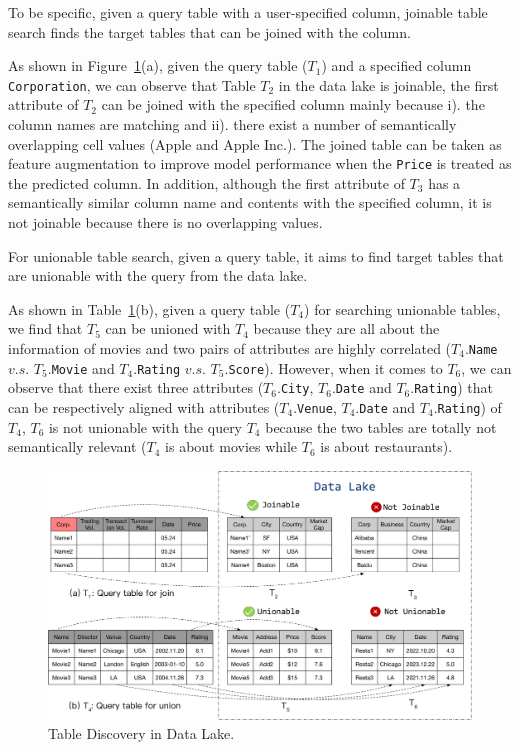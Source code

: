 To be specific, given a query table with a user-specified column, joinable table search finds the target tables that can be joined with the column.

\begin{example}
	As shown in Figure~\ref{fig:example}(a), given the query table ($T_1$) and a specified column \texttt{Corporation},  
	we can observe that Table $T_2$ in the data lake is joinable, \ie the first attribute of $T_2$ can be joined with the specified column mainly because i). the column names are  matching  and 
	ii). there exist a number of semantically overlapping cell values (\eg Apple and Apple Inc.). 
	The joined table can be taken as feature augmentation to improve model performance when  the \texttt{Price} is treated as the predicted column. 
	In addition, although the first attribute of $T_3$ has a semantically similar column name and contents  with the specified column, it is not joinable because there is no overlapping values.
\end{example}

 For unionable table search, given a query table, it aims to find target tables that are unionable with the query from the data lake.                  
 
 \begin{example}
 	As shown in Table~\ref{fig:example}(b), given a query table ($T_4$)  for searching unionable tables, we find that  $T_5$ can be unioned with $T_4$ because they are all about the information of movies and  two pairs of attributes are highly correlated ($T_4$.\texttt{Name} $v.s.$ $T_5$.\texttt{Movie} and $T_4$.\texttt{Rating} $v.s.$ $T_5$.\texttt{Score}). 
 	However, when it comes to $T_6$, we can observe that there exist three attributes ($T_6$.\texttt{City}, $T_6$.\texttt{Date} and $T_6$.\texttt{Rating}) that can be respectively aligned with attributes ($T_4$.\texttt{Venue}, $T_4$.\texttt{Date} and $T_4$.\texttt{Rating}) of $T_4$,  $T_6$ is not unionable with the query $T_4$ because the two tables are totally not semantically relevant ($T_4$ is about movies while $T_6$ is about restaurants).
 \end{example}



\begin{figure}[h]
	\centering
	\includegraphics[width=0.8\linewidth]{fig/example.pdf}
	\caption{Table Discovery in Data Lake.}
	\label{fig:example}
\end{figure}



